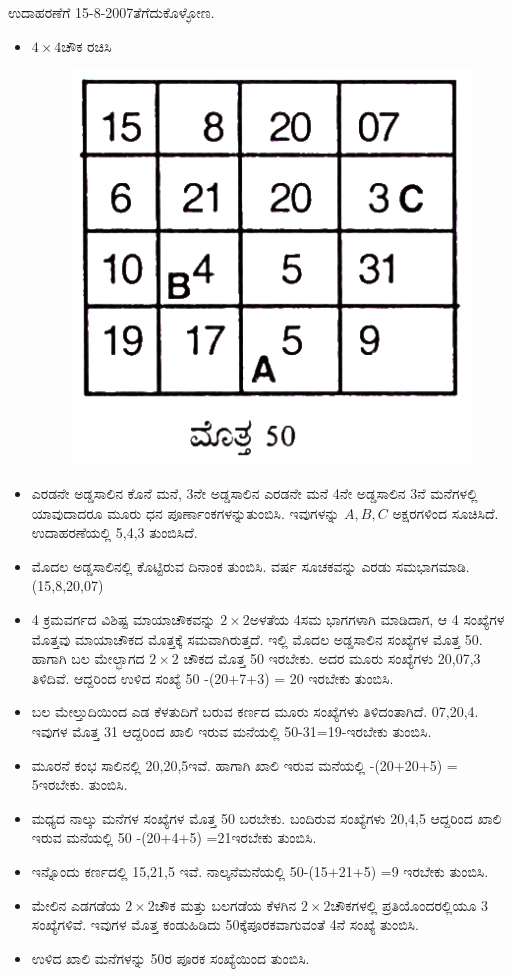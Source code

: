 ಉದಾಹರಣೆಗೆ 15-8-2007ತೆಗೆದುಕೊಳ್ಳೋಣ.
\begin{itemize}
	\item $4 \times 4$ಚೌಕ ರಚಿಸಿ
	\begin{figure}[H]
	\includegraphics[scale=.9]{src/figures/chap3/fig3.46.jpg}
	\end{figure}
	\item ಎರಡನೇ ಅಡ್ಡಸಾಲಿನ ಕೊನೆ ಮನೆ, 3ನೇ ಅಡ್ಡಸಾಲಿನ ಎರಡನೇ ಮನೆ 4ನೇ ಅಡ್ಡ\-ಸಾಲಿನ 3ನೆ ಮನೆಗಳಲ್ಲಿ ಯಾವುದಾದರೂ ಮೂರು ಧನ ಪೂರ್ಣಾಂಕಗಳನ್ನು\break ತುಂಬಿಸಿ. ಇವುಗಳನ್ನು $A,B,C$ ಅಕ್ಷರಗಳಿಂದ ಸೂಚಿಸಿದೆ. ಉದಾಹರಣೆಯಲ್ಲಿ 5,4,3 ತುಂಬಿಸಿದೆ.
	\item ಮೊದಲ ಅಡ್ಡಸಾಲಿನಲ್ಲಿ ಕೊಟ್ಟಿರುವ ದಿನಾಂಕ ತುಂಬಿಸಿ. ವರ್ಷ ಸೂಚಕವನ್ನು ಎರಡು ಸಮಭಾಗಮಾಡಿ. (15,8,20,07)
	\item 4 ಕ್ರಮವರ್ಗದ ವಿಶಿಷ್ಟ ಮಾಯಾಚೌಕವನ್ನು $2 \times 2$ಅಳತೆಯ 4ಸಮ ಭಾಗಗಳಾಗಿ ಮಾಡಿದಾಗ, ಆ 4 ಸಂಖ್ಯೆಗಳ ಮೊತ್ತವು ಮಾಯಾಚೌಕದ ಮೊತ್ತಕ್ಕೆ ಸಮವಾಗಿರುತ್ತದೆ. ಇಲ್ಲಿ ಮೊದಲ ಅಡ್ಡಸಾಲಿನ ಸಂಖ್ಯೆಗಳ ಮೊತ್ತ 50. ಹಾಗಾಗಿ ಬಲ ಮೇಲ್ಭಾಗದ $2 \times 2$ ಚೌಕದ ಮೊತ್ತ 50 ಇರಬೇಕು. ಅದರ ಮೂರು ಸಂಖ್ಯೆಗಳು 20,07,3 ತಿಳಿದಿವೆ. ಆದ್ದರಿಂದ ಉಳಿದ ಸಂಖ್ಯೆ 50 -(20+7+3) = 20 ಇರಬೇಕು ತುಂಬಿಸಿ.
	\item ಬಲ ಮೇಲ್ತುದಿಯಿಂದ ಎಡ ಕೆಳತುದಿಗೆ ಬರುವ ಕರ್ಣದ ಮೂರು ಸಂಖ್ಯೆಗಳು ತಿಳಿದಂತಾಗಿದೆ. 07,20,4. ಇವುಗಳ ಮೊತ್ತ 31 ಆದ್ದರಿಂದ ಖಾಲಿ ಇರುವ ಮನೆಯಲ್ಲಿ 50-31=19-ಇರಬೇಕು ತುಂಬಿಸಿ.
	\item ಮೂರನೆ ಕಂಭ ಸಾಲಿನಲ್ಲಿ 20,20,5ಇವೆ. ಹಾಗಾಗಿ ಖಾಲಿ ಇರುವ ಮನೆಯಲ್ಲಿ -(20+20+5) = 5ಇರಬೇಕು. ತುಂಬಿಸಿ.
	\item ಮಧ್ಯದ ನಾಲ್ಕು ಮನೆಗಳ ಸಂಖ್ಯೆಗಳ ಮೊತ್ತ 50 ಬರಬೇಕು. ಬಂದಿರುವ ಸಂಖ್ಯೆಗಳು 20,4,5 ಆದ್ದರಿಂದ ಖಾಲಿ ಇರುವ ಮನೆಯಲ್ಲಿ 50 -(20+4+5) =21ಇರಬೇಕು ತುಂಬಿಸಿ.
	\item ಇನ್ನೊಂದು ಕರ್ಣದಲ್ಲಿ 15,21,5 ಇವೆ. ನಾಲ್ಕನೆಮನೆಯಲ್ಲಿ 50-(15+21+5) =9 ಇರಬೇಕು ತುಂಬಿಸಿ.
	\item ಮೇಲಿನ ಎಡಗಡೆಯ $2 \times 2$ಚೌಕ ಮತ್ತು ಬಲಗಡೆಯ ಕೆಳಗಿನ $2 \times 2$ಚೌಕಗಳಲ್ಲಿ ಪ್ರತಿಯೊಂದರಲ್ಲಿಯೂ 3 ಸಂಖ್ಯೆಗಳಿವೆ. ಇವುಗಳ ಮೊತ್ತ ಕಂಡುಹಿಡಿದು 50ಕ್ಕೆ\break ಪೂರಕವಾಗುವಂತೆ 4ನೆ ಸಂಖ್ಯೆ ತುಂಬಿಸಿ.
	\item ಉಳಿದ ಖಾಲಿ ಮನೆಗಳನ್ನು 50ರ ಪೂರಕ ಸಂಖ್ಯೆಯಿಂದ ತುಂಬಿಸಿ.
\end{itemize}


